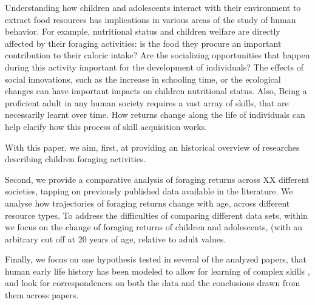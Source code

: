 Understanding how children and adolescents interact with their environment to extract food resources has implications in various areas of the study of human behavior. 
For example, nutritional status and children welfare are directly affected by their foraging activities: is the food they procure an important contribution to their caloric intake? Are the socializing opportunities that happen during this activity important for the development of individuals? The effects of social innovations, such as the increase in schooling time, or the ecological changes can have important impacts on children nutritional status. 
Also, Being a proficient adult in any human society requires a vast array of skills, that are necessarily learnt over time. How returns change along the life of individuals can help clarify how this process of skill acquisition works.



With this paper, we aim, first, at providing an historical overview of researches describing children foraging activities. 

Second, we provide a comparative analysis of foraging returns across XX different societies, tapping on previously published data available in the literature. 
We analyse how trajectories of foraging returns change with age, across different resource types. To address the difficulties of comparing different data sets, within we focus on the change of foraging returns of children and adolescents, (with an arbitrary cut off at 20 years of age, relative to adult values.

Finally, we focus on one hypothesis tested in several of the analyzed papers, that human early life history has been modeled to allow for learning of complex skills \cite{kaplan_theory_2000}, and look for correspondences on both the data and the conclusions drawn from them across papers.  





